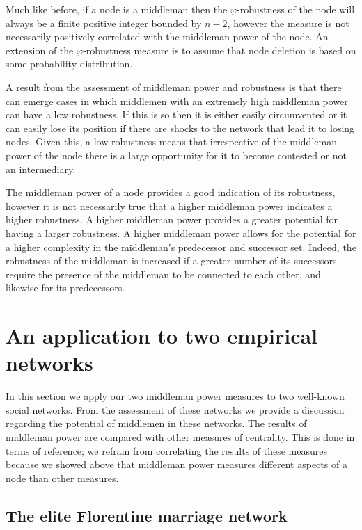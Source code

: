 Much like before, if a node is a middleman then the $\varphi$-robustness of the node will always be a finite positive integer bounded by $n-2$, however the measure is not necessarily positively correlated with the middleman power of the node. An extension of the $\varphi$-robustness measure is to assume that node deletion is based on some probability distribution.

\medskip \noindent A result from the assessment of middleman power and robustness is that there can emerge cases in which middlemen with an extremely high middleman power can have a low robustness. If this is so then it is either easily circumvented or it can easily lose its position if there are shocks to the network that lead it to losing nodes. Given this, a low robustness means that irrespective of the middleman power of the node there is a large opportunity for it to become contested or not an intermediary.

The middleman power of a node provides a good indication of its robustness, however it is not necessarily true that a higher middleman power indicates a higher robustness. A higher middleman power provides a greater potential for having a larger robustness. A higher middleman power allows for the potential for a higher complexity in the middleman's predecessor and successor set. Indeed, the robustness of the middleman is increased if a greater number of its successors require the presence of the middleman to be connected to each other, and likewise for its predecessors.


\section{An application to two empirical networks}

In this section we apply our two middleman power measures to two well-known social networks. From the assessment of these networks we provide a discussion regarding the potential of middlemen in these networks. The results of middleman power are compared with other measures of centrality. This is done in terms of reference; we refrain from correlating the results of these measures because we showed above that middleman power measures different aspects of a node than other measures.

\subsection{The elite Florentine marriage network}

